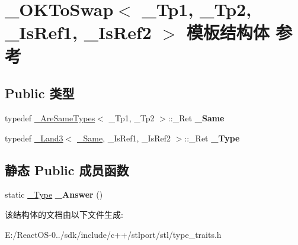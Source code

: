 \hypertarget{struct___o_k_to_swap}{}\section{\+\_\+\+O\+K\+To\+Swap$<$ \+\_\+\+Tp1, \+\_\+\+Tp2, \+\_\+\+Is\+Ref1, \+\_\+\+Is\+Ref2 $>$ 模板结构体 参考}
\label{struct___o_k_to_swap}
\subsection*{Public 类型}
\begin{DoxyCompactItemize}
\item 
\mbox{\label{struct___o_k_to_swap_a048523dd51c34c2f23eddebd4fa3e09d}} 
typedef \hyperlink{struct___are_same_types}{\+\_\+\+Are\+Same\+Types}$<$ \+\_\+\+Tp1, \+\_\+\+Tp2 $>$\+::\+\_\+\+Ret {\bfseries \+\_\+\+Same}
\item 
\mbox{\label{struct___o_k_to_swap_a96b7fa2809594b86de943ed6bfbc018b}} 
typedef \hyperlink{struct___land3}{\+\_\+\+Land3}$<$ \hyperlink{struct____false__type}{\+\_\+\+Same}, \+\_\+\+Is\+Ref1, \+\_\+\+Is\+Ref2 $>$\+::\+\_\+\+Ret {\bfseries \+\_\+\+Type}
\end{DoxyCompactItemize}
\subsection*{静态 Public 成员函数}
\begin{DoxyCompactItemize}
\item 
\mbox{\label{struct___o_k_to_swap_ac8126986108471a0f8c029b417380d51}} 
static \hyperlink{struct____false__type}{\+\_\+\+Type} {\bfseries \+\_\+\+Answer} ()
\end{DoxyCompactItemize}


该结构体的文档由以下文件生成\+:\begin{DoxyCompactItemize}
\item 
E\+:/\+React\+O\+S-\/0../sdk/include/c++/stlport/stl/type\+\_\+traits.\+h\end{DoxyCompactItemize}

